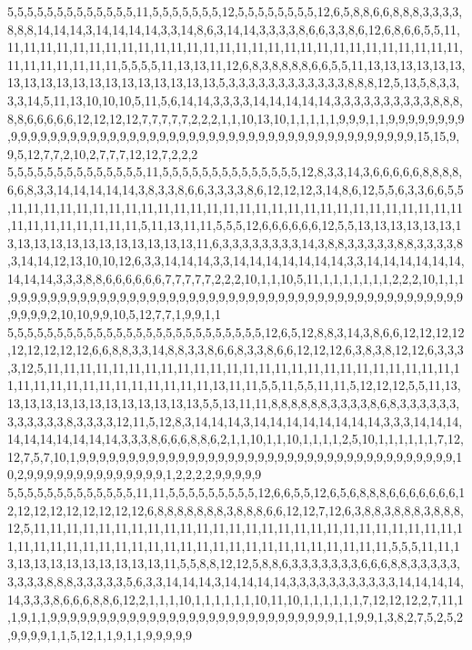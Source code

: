 5,5,5,5,5,5,5,5,5,5,5,5,5,11,5,5,5,5,5,5,5,12,5,5,5,5,5,5,5,5,12,6,5,8,8,6,6,8,8,8,3,3,3,3,8,8,8,14,14,14,3,14,14,14,14,3,3,14,8,6,3,14,14,3,3,3,3,8,6,6,3,3,8,6,12,6,8,6,6,5,5,11,11,11,11,11,11,11,11,11,11,11,11,11,11,11,11,11,11,11,11,11,11,11,11,11,11,11,11,11,11,11,11,11,11,11,11,5,5,5,5,11,13,13,11,12,6,8,3,8,8,8,8,6,6,5,5,11,13,13,13,13,13,13,13,13,13,13,13,13,13,13,13,13,13,13,13,5,3,3,3,3,3,3,3,3,3,3,3,3,8,8,8,12,5,13,5,8,3,3,3,3,14,5,11,13,10,10,10,5,11,5,6,14,14,3,3,3,3,14,14,14,14,14,3,3,3,3,3,3,3,3,3,3,8,8,8,8,8,6,6,6,6,6,12,12,12,12,7,7,7,7,7,2,2,2,1,1,10,13,10,1,1,1,1,1,9,9,9,1,1,9,9,9,9,9,9,9,9,9,9,9,9,9,9,9,9,9,9,9,9,9,9,9,9,9,9,9,9,9,9,9,9,9,9,9,9,9,9,9,9,9,9,9,9,9,9,9,9,9,15,15,9,9,5,12,7,7,2,10,2,7,7,7,12,12,7,2,2,2
5,5,5,5,5,5,5,5,5,5,5,5,5,5,11,5,5,5,5,5,5,5,5,5,5,5,5,5,5,12,8,3,3,14,3,6,6,6,6,6,8,8,8,8,6,6,8,3,3,14,14,14,14,14,3,8,3,3,8,6,6,3,3,3,3,8,6,12,12,12,3,14,8,6,12,5,5,6,3,3,6,6,5,5,11,11,11,11,11,11,11,11,11,11,11,11,11,11,11,11,11,11,11,11,11,11,11,11,11,11,11,11,11,11,11,11,11,11,11,11,5,11,13,11,11,5,5,5,12,6,6,6,6,6,6,12,5,5,13,13,13,13,13,13,13,13,13,13,13,13,13,13,13,13,13,13,11,6,3,3,3,3,3,3,3,3,14,3,8,8,3,3,3,3,3,8,8,3,3,3,3,8,3,14,14,12,13,10,10,12,6,3,3,14,14,14,3,3,14,14,14,14,14,14,14,3,3,14,14,14,14,14,14,14,14,14,3,3,3,8,8,6,6,6,6,6,6,7,7,7,7,7,2,2,2,10,1,1,10,5,11,1,1,1,1,1,1,1,2,2,2,10,1,1,1,9,9,9,9,9,9,9,9,9,9,9,9,9,9,9,9,9,9,9,9,9,9,9,9,9,9,9,9,9,9,9,9,9,9,9,9,9,9,9,9,9,9,9,9,9,9,9,9,9,9,2,10,10,9,9,10,5,12,7,7,1,9,9,1,1
5,5,5,5,5,5,5,5,5,5,5,5,5,5,5,5,5,5,5,5,5,5,5,5,5,5,12,6,5,12,8,8,3,14,3,8,6,6,12,12,12,12,12,12,12,12,12,6,6,8,8,3,3,14,8,8,3,3,8,6,6,8,3,3,8,6,6,12,12,12,6,3,8,3,8,12,12,6,3,3,3,3,12,5,11,11,11,11,11,11,11,11,11,11,11,11,11,11,11,11,11,11,11,11,11,11,11,11,11,11,11,11,11,11,11,11,11,11,11,11,11,11,13,11,11,5,5,11,5,5,11,11,5,12,12,12,5,5,11,13,13,13,13,13,13,13,13,13,13,13,13,13,5,5,13,11,11,8,8,8,8,8,8,3,3,3,3,8,6,8,3,3,3,3,3,3,3,3,3,3,3,3,8,3,3,3,3,12,11,5,12,8,3,14,14,14,3,14,14,14,14,14,14,14,14,3,3,3,14,14,14,14,14,14,14,14,14,14,3,3,3,8,6,6,6,8,8,6,2,1,1,10,1,1,10,1,1,1,1,2,5,10,1,1,1,1,1,1,7,12,12,7,5,7,10,1,9,9,9,9,9,9,9,9,9,9,9,9,9,9,9,9,9,9,9,9,9,9,9,9,9,9,9,9,9,9,9,9,9,9,9,9,9,9,10,2,9,9,9,9,9,9,9,9,9,9,9,9,9,9,1,2,2,2,2,9,9,9,9,9
5,5,5,5,5,5,5,5,5,5,5,5,5,11,11,5,5,5,5,5,5,5,5,5,12,6,6,5,5,12,6,5,6,8,8,8,6,6,6,6,6,6,6,12,12,12,12,12,12,12,12,12,6,8,8,8,8,8,8,8,3,8,8,8,6,6,12,12,7,12,6,3,8,8,3,8,8,8,3,8,8,8,12,5,11,11,11,11,11,11,11,11,11,11,11,11,11,11,11,11,11,11,11,11,11,11,11,11,11,11,11,11,11,11,11,11,11,11,11,11,11,11,11,11,11,11,11,11,11,11,11,11,11,11,5,5,5,11,11,13,13,13,13,13,13,13,13,13,13,11,5,5,8,8,12,12,5,8,8,6,3,3,3,3,3,3,3,6,6,6,8,8,3,3,3,3,3,3,3,3,3,8,8,8,3,3,3,3,3,5,6,3,3,14,14,14,3,14,14,14,14,3,3,3,3,3,3,3,3,3,3,3,14,14,14,14,14,3,3,3,8,6,6,6,8,8,6,12,2,1,1,1,10,1,1,1,1,1,1,10,11,10,1,1,1,1,1,1,7,12,12,12,2,7,11,1,1,9,1,1,9,9,9,9,9,9,9,9,9,9,9,9,9,9,9,9,9,9,9,9,9,9,9,9,9,9,9,9,9,1,1,9,9,1,3,8,2,7,5,2,5,2,9,9,9,9,1,1,5,12,1,1,9,1,1,9,9,9,9,9
